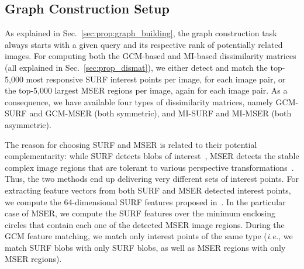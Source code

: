 

\subsection{Graph Construction Setup}
\label{sec:exp_p2}
As explained in Sec.~\ref{sec:prop:graph_building}, the graph construction task always starts with a given query and its respective rank of potentially related images.
For computing both the GCM-based and MI-based dissimilarity matrices (all explained in Sec.~\ref{sec:prop_dismat}), we either detect and match the top-5,000 most responsive SURF interest points per image, for each image pair, or the top-5,000 largest MSER regions per image, again for each image pair.
As a consequence, we have available four types of dissimilarity matrices, namely GCM-SURF and GCM-MSER (both symmetric), and MI-SURF and MI-MSER (both asymmetric).

The reason for choosing SURF and MSER is related to their potential complementarity: while SURF detects blobs of interest~\cite{Bay:CVIU:2008}, MSER detects the stable complex image regions that are tolerant to various perspective transformations~\cite{Matas_2004}.
Thus, the two methods end up delivering very different sets of interest points.
For extracting feature vectors from both SURF and MSER detected interest points, we compute the 64-dimensional SURF features proposed in~\cite{Bay:CVIU:2008}.
In the particular case of MSER, we compute the SURF features over the minimum enclosing circles that contain each one of the detected MSER image regions.
During the GCM feature matching, we match only interest points of the same type (\textit{i.e.}, we match SURF blobs with only SURF blobs, as well as MSER regions with only MSER regions).


